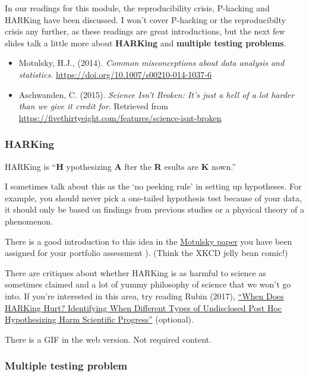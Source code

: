 \documentclass[
  openany]{book}
\providecommand{\tightlist}{%
  \setlength{\itemsep}{0pt}\setlength{\parskip}{0pt}}
\begin{document}
In our readings for this module, the reproducibility crisis, P-hacking and HARKing have been discussed. I won't cover P-hacking or the reproducibilty crisis any further, as these readings are great introductions, but the next few slides talk a little more about \textbf{HARKing} and \textbf{multiple testing problems}.

\begin{itemize}
\tightlist
\item
  Motulsky, H.J., (2014). \emph{Common misconceptions about data analysis and statistics.} \url{https://doi.org/10.1007/s00210-014-1037-6}
\item
  Aschwanden, C. (2015). \emph{Science Isn't Broken: It's just a hell of a lot harder than we give it credit for}. Retrieved from \url{https://fivethirtyeight.com/features/science-isnt-broken}
\end{itemize}

\hypertarget{harking}{%
\subsubsection{HARKing}\label{harking}}

HARKing is ``\textbf{H} ypothesizing \textbf{A} fter the \textbf{R} esults are \textbf{K} nown.''

I sometimes talk about this as the `no peeking rule' in setting up hypotheses. For example, you should never pick a one-tailed hypothesis test because of your data, it should only be based on findings from previous studies or a physical theory of a phenomenon.

There is a good introduction to this idea in the \href{https://link.springer.com/article/10.1007\%2Fs00210-014-1037-6}{Motulsky paper} you have been assigned for your portfolio assessment ). (Think the XKCD jelly bean comic!)

There are critiques about whether HARKing is as harmful to science as sometimes claimed and a lot of yummy philosophy of science that we won't go into. If you're interested in this area, try reading Rubin (2017), \href{https://journals.sagepub.com/doi/10.1037/gpr0000128}{``When Does HARKing Hurt? Identifying When Different Types of Undisclosed Post Hoc Hypothesizing Harm Scientific Progress''} (optional).

There is a GIF in the web version. Not required content.

\hypertarget{multiple-testing-problem}{%
\subsubsection{Multiple testing problem}\label{multiple-testing-problem}}
\end{document}
